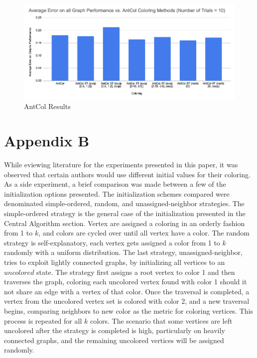 \documentclass[runningheads]{llncs}
\begin{document}
\begin{figure}[h]
  \centering
  \includegraphics[width=1\textwidth]{AntCol.png}
  \caption{AntCol Results}
  \label{fig:antcol}
\end{figure}

\newpage
\section{Appendix B}
While eviewing literature for the experiments presented in this paper, it was observed that certain authors would use different initial values for their coloring. As a side experiment, a brief comparison was made between a few of the initialization options presented. The initialization schemes compared were denominated simple-ordered, random, and unassigned-neighbor strategies.
The simple-ordered strategy is the general case of the initialization presented in the Central Algorithm section. Vertex are assigned a coloring in an orderly fashion from 1 to $k$, and colors are cycled over until all vertex have a color. The random strategy is self-explanatory, each vertex gets assigned a color from 1 to $k$ randomly with a uniform distribution. The last strategy, unassigned-neighbor, tries to exploit lightly connected graphs, by initializing all vertices to an $uncolored$ state.
The strategy first assigns a root vertex to color 1 and then traverses the graph, coloring each uncolored vertex found with color 1 should it not share an edge with a vertex of that color. Once the traversal is completed, a vertex from the uncolored vertex set is colored with color 2, and a new traversal begins, comparing neighbors to new color as the metric for coloring vertices. This process is repeated for all $k$ colors. The scenario that some vertices are left uncolored after the strategy is completed is high, particularly on heavily connected graphs, and the remaining uncolored vertices will be assigned randomly.\\
\end{document}
